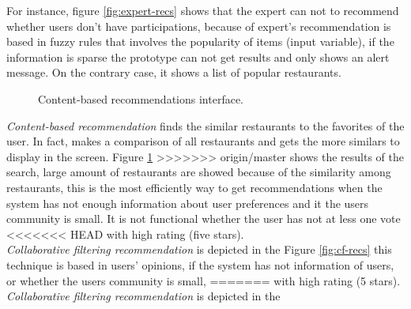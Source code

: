 For instance, figure \ref{fig:expert-recs} shows that the expert can 
not to recommend
whether users don’t have participations, because of expert's
recommendation is based in fuzzy rules that involves the popularity of
items (input variable), if the information is sparse the prototype can
not get results and only shows an alert message. On the contrary case,
it shows a list of popular restaurants.\\ 
\begin{figure}
\captionsetup{font=footnotesize}
\centering
{}
\caption{Content-based recommendations interface.}
\label{fig:base-content}   
\end{figure}
\textit{Content-based recommendation} finds the similar restaurants to the
favorites of the user. In fact, makes a comparison of all restaurants
and gets the more similars to display in the screen. 
Figure \ref{fig:base-content}  
>>>>>>> origin/master
shows the results of the search, large amount of restaurants are showed
because of the similarity among restaurants, this is the most
efficiently way to get recommendations when the system has not enough
information about user preferences and it the users community is
small. It is not functional whether the user has not at less one vote
<<<<<<< HEAD
with high rating (five stars).\\
\textit{Collaborative filtering recommendation} is depicted in the 
Figure  \ref{fig:cf-recs}
this technique is based in users' opinions, if the system has not
information of users, or whether the users community is small, 
=======
with high rating (5 stars).\\ 
\textit{Collaborative filtering recommendation} is depicted in the 
